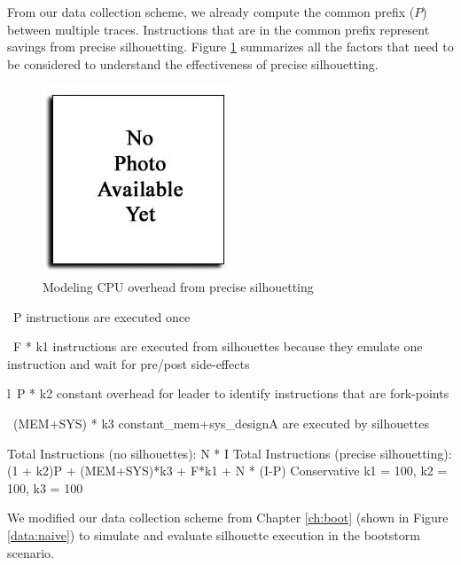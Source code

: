 From our data collection scheme, we already compute the 
common prefix ($P$) between multiple traces. 
Instructions that are in the common prefix 
represent savings from precise silhouetting.
Figure \ref{psoverhead} summarizes
all the factors that need
to be considered to 
understand the effectiveness of 
precise silhouetting.

\begin{figure}
  \centering
  \includegraphics[scale=0.64, trim=1cm 0cm 1cm 0cm]{none.jpg}
  \caption[Modeling CPU overhead from precise silhouetting]%
          {Modeling CPU overhead from precise silhouetting}
  \label{psoverhead}
\end{figure}





~P instructions are executed once

~F * k1 instructions are executed from silhouettes because
     they emulate one instruction and wait for pre/post side-effects

l~P * k2 constant overhead for leader to identify instructions that are fork-points

~(MEM+SYS) * k3 constant_mem+sys_designA are executed by silhouettes


Total Instructions (no silhouettes): N * I
Total Instructions (precise silhouetting): (1 + k2)P + (MEM+SYS)*k3 + F*k1
                                              + N * (I-P)
     Conservative k1 = 100, k2 = 100, k3 = 100

 





We modified our data collection scheme from Chapter \ref{ch:boot} 
(shown in Figure \ref{data:naive}) to simulate and
evaluate silhouette execution in the bootstorm scenario.



